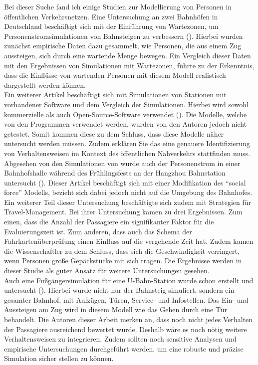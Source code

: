 Bei dieser Suche fand ich einige Studien zur Modellierung von Personen in öffentlichen Verkehrsnetzen.
Eine Untersuchung an zwei Bahnhöfen in Deutschland beschäftigt sich mit der Einführung von Wartezonen, um Personenstromsimulationen von Bahnsteigen zu verbessern (\cite{Davidich.2013}). Hierbei wurden zunächst empirische Daten dazu gesammelt, wie Personen, die aus einem Zug aussteigen, sich durch eine wartende Menge bewegen. Ein Vergleich dieser Daten mit den Ergebnissen von Simulationen mit Wartezonen, führte zu der Erkenntnis, dass die Einflüsse von wartenden Personen mit diesem Modell realistisch dargestellt werden können. \\
Ein weiterer Artikel beschäftigt sich mit Simulationen von Stationen mit vorhandener Software und dem Vergleich der Simulationen. Hierbei wird sowohl kommerzielle als auch Open-Source-Software verwendet (\cite{DubrocaVoisin.2019}). Die Modelle, welche von den Programmen verwendet werden, wurden von den Autoren jedoch nicht getestet. Somit kommen diese zu dem Schluss, dass diese Modelle näher untersucht werden müssen. Zudem erklären Sie das eine genauere Identifizierung von Verhaltensweisen im Kontext des öffentlichen Nahverkehrs stattfinden muss.\\
Abgesehen von den Simulationen von \cite{DubrocaVoisin.2019} wurde auch der Personenstrom in einer Bahnhofshalle während des Frühlingsfests an der Hangzhou Bahnstation untersucht (\cite{Wang.2013}). Dieser Artikel beschäftigt sich mit einer Modifikation des "`social force"' Modells, bezieht sich dabei jedoch nicht auf die Umgebung des Bahnhofes. Ein weiterer Teil dieser Untersuchung beschäftigte sich zudem mit Strategien für Travel-Management. Bei ihrer Untersuchung kamen \cite{Wang.2013} zu drei Ergebnissen. Zum einen, dass die Anzahl der Passagiere ein signifikanter Faktor für die Evaluierungszeit ist. Zum anderen, dass auch das Schema der Fahrkartenüberprüfung einen Einfluss auf die vergehende Zeit hat. Zudem kamen die Wissenschaftler zu dem Schluss, dass sich die Geschwindigkeit verringert, wenn Personen große Gepäckstücke mit sich tragen. Die Ergebnisse werden in dieser Studie als guter Ansatz für weitere Untersuchungen gesehen. \\
Auch eine Fußgängersimulation für eine U-Bahn-Station wurde schon erstellt und untersucht (\cite{Chen.2017}). Hierbei wurde nicht nur der Bahnsteig simuliert, sondern ein gesamter Bahnhof, mit Aufzügen, Türen, Service- und Infostellen. Das Ein- und Aussteigen am Zug wird in diesem Modell wie das Gehen durch eine Tür behandelt. Die Autoren dieser Arbeit merken an, dass noch nicht jedes Verhalten der Passagiere ausreichend bewertet wurde. Deshalb wäre es noch nötig weitere Verhaltensweisen zu integrieren. Zudem sollten noch sensitive Analysen und empirische Untersuchungen durchgeführt werden, um eine robuste und präzise Simulation sicher stellen zu können. \\
